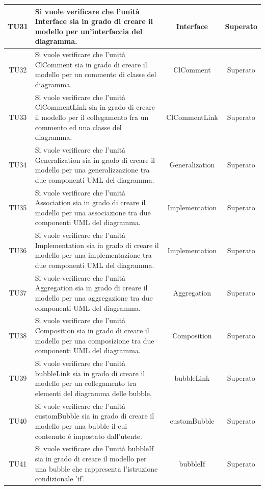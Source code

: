 \documentclass[../PianoDiQualifica.tex]{subfiles}
\begin{document}
\begin{longtable}{|c|>{\centering}p{8cm}|c|c|}
		\hline
		\hypertarget{TU31}{TU31}&Si vuole verificare che l'unità Interface sia in grado di creare il modello per un'interfaccia del diagramma. & Interface &Superato\\
		\hline
		\hypertarget{TU32}{TU32}&Si vuole verificare che l'unità ClComment sia in grado di creare il modello per un commento di classe del diagramma. &ClComment  &Superato\\
		\hline
		\hypertarget{TU33}{TU33}& Si vuole verificare che l'unità ClCommentLink sia in grado di creare il modello per il collegamento fra un commento ed una classe del diagramma. &ClCommentLink &Superato\\
		\hline
		\hypertarget{TU34}{TU34}&Si vuole verificare che l'unità Generalization sia in grado di creare il modello per una generalizzazione tra due componenti UML del diagramma. &Generalization &Superato\\
		\hline
		\hypertarget{TU35}{TU35}& Si vuole verificare che l'unità Association sia in grado di creare il modello per una associazione tra due componenti UML del diagramma.&Implementation &Superato\\
		\hline
		\hypertarget{TU36}{TU36}&Si vuole verificare che l'unità Implementation sia in grado di creare il modello per una implementazione tra due componenti UML del diagramma. &Implementation &Superato\\
		\hline
		\hypertarget{TU37}{TU37}&Si vuole verificare che l'unità Aggregation sia in grado di creare il modello per una aggregazione tra due componenti UML del diagramma. &Aggregation  &Superato\\
		\hline
		\hypertarget{TU38}{TU38}&Si vuole verificare che l'unità Composition sia in grado di creare il modello per una composizione tra due componenti UML del diagramma. &Composition &Superato\\
		\hline
		\hypertarget{TU39}{TU39}& Si vuole verificare che l'unità bubbleLink sia in grado di creare il modello per un collegamento tra elementi del diagramma delle bubble.&bubbleLink &Superato\\
		\hline
		\hypertarget{TU40}{TU40}&Si vuole verificare che l'unità customBubble sia in grado di creare il modello per una bubble il cui contenuto è impostato dall'utente.& customBubble &Superato\\
		\hline
		\hypertarget{TU41}{TU41}& Si vuole verificare che l'unità bubbleIf sia in grado di creare il modello per una bubble che rappresenta l'istruzione condizionale 'if'. & bubbleIf&Superato\\

\end{longtable}
\end{document}
